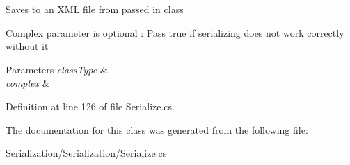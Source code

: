 Saves to an X\-M\-L file from passed in class 

Complex parameter is optional \-: Pass true if serializing does not work correctly without it 


\begin{DoxyParams}{Parameters}
{\em class\-Type} & \\
\hline
{\em complex} & \\
\hline
\end{DoxyParams}


Definition at line 126 of file Serialize.\-cs.



The documentation for this class was generated from the following file\-:\begin{DoxyCompactItemize}
\item 
Serialization/\-Serialization/Serialize.\-cs\end{DoxyCompactItemize}
